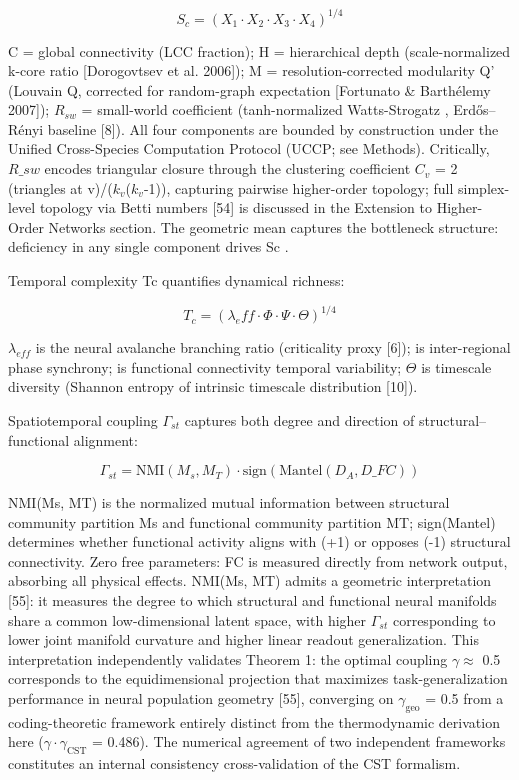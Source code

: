 \documentclass[a4paper,12pt]{article}
\begin{document}
\begin{equation}
S_c = (X_1 \cdot X_2 \cdot X_3 \cdot X_4)^{1/4} \tag{2}
\end{equation}

C = global connectivity (LCC fraction); H = hierarchical depth (scale-normalized k-core ratio [Dorogovtsev et al. 2006]); M = resolution-corrected modularity Q' (Louvain Q, corrected for random-graph expectation [Fortunato \& Barth\'elemy 2007]); $R_{sw}$ = small-world coefficient (tanh-normalized Watts-Strogatz  \sigma , Erd\H{o}s--R\'enyi baseline [8]).
All four components are bounded  \in  [0,1] by construction under the Unified Cross-Species Computation Protocol (UCCP; see Methods).
Critically, $R\_{sw}$ encodes triangular closure through the clustering coefficient $C_{v}$ = 2 \cdot (triangles at v)/($k_{v}$($k_{v}$-1)), capturing pairwise higher-order topology; full simplex-level topology via Betti numbers [54] is discussed in the Extension to Higher-Order Networks section.
The geometric mean captures the bottleneck structure: deficiency in any single component drives Sc  .

Temporal complexity Tc quantifies dynamical richness:

\begin{equation}
T_c = (\lambda_eff \cdot \Phi \cdot \Psi \cdot \Theta)^{1/4} \tag{3}
\end{equation}

$\lambda_{eff}$ is the neural avalanche branching ratio (criticality proxy [6]);  \Phi  is inter-regional phase synchrony;  \Psi  is functional connectivity temporal variability; $\Theta$ is timescale diversity (Shannon entropy of intrinsic timescale distribution [10]).

Spatiotemporal coupling $\Gamma_{st}$  \in  [-1, 1] captures both degree and direction of structural--functional alignment:

\begin{equation}
\Gamma_{st} = \text{NMI}(M_s, M_T) \cdot \text{sign}(\text{Mantel}(D_A, D\_{FC})) \tag{4}
\end{equation}

NMI(Ms, MT) is the normalized mutual information between structural community partition Ms and functional community partition MT; sign(Mantel) determines whether functional activity aligns with (+1) or opposes (-1) structural connectivity.
Zero free parameters: FC is measured directly from network output, absorbing all physical effects.
NMI(Ms, MT) admits a geometric interpretation [55]: it measures the degree to which structural and functional neural manifolds share a common low-dimensional latent space, with higher $\Gamma_{st}$ corresponding to lower joint manifold curvature and higher linear readout generalization.
This interpretation independently validates Theorem 1: the optimal coupling $\gamma \approx$ 0.5 corresponds to the equidimensional projection that maximizes task-generalization performance in neural population geometry [55], converging on $\gamma_{\text{geo}}$ = 0.5 from a coding-theoretic framework entirely distinct from the thermodynamic derivation here ($\gamma \cdot \gamma_{\text{CST}}$ = 0.486).
The numerical agreement of two independent frameworks constitutes an internal consistency cross-validation of the CST formalism.
\end{document}
